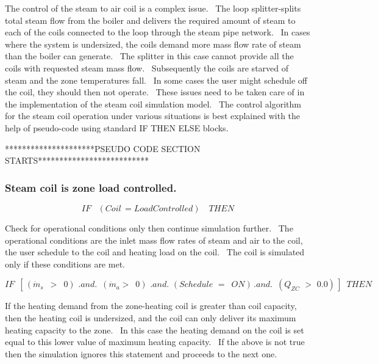 The control of the steam to air coil is a complex issue.~ The loop splitter-splits total steam flow from the boiler and delivers the required amount of steam to each of the coils connected to the loop through the steam pipe network.~ In cases where the system is undersized, the coils demand more mass flow rate of steam than the boiler can generate.~ The splitter in this case cannot provide all the coils with requested steam mass flow.~ Subsequently the coils are starved of steam and the zone temperatures fall.~ In some cases the user might schedule off the coil, they should then not operate.~ These issues need to be taken care of in the implementation of the steam coil simulation model.~ The control algorithm for the steam coil operation under various situations is best explained with the help of pseudo-code using standard IF THEN ELSE blocks.

*********************PSEUDO CODE SECTION STARTS**************************

\subsubsection{Steam coil is zone load controlled.}\label{steam-coil-is-zone-load-controlled.}

\begin{equation}
IF\,\,\,\,\,(Coil\, = LoadControlled)\,\,\,\,\,\,THEN\,
\end{equation}

Check for operational conditions only then continue simulation further.~ The operational conditions are the inlet mass flow rates of steam and air to the coil, the user schedule to the coil and heating load on the coil.~ The coil is simulated only if these conditions are met.

\begin{equation}
IF\,\,\,\left[ {\,({{\dot m}_s}\,\,\, > \,\,\,0)\,\,.and.\,\,\,({{\dot m}_a} > \,\,\,0)\,\,.and.\,\,(Schedule\,\, = \,\,\,ON)\,.and.\,\,\,({Q_{ZC}}\,\, > \,\,0.0)\,} \right]\,\,\,THEN
\end{equation}

If the heating demand from the zone-heating coil is greater than coil capacity, then the heating coil is undersized, and the coil can only deliver its maximum heating capacity to the zone.~ In this case the heating demand on the coil is set equal to this lower value of maximum heating capacity.~ If the above is not true then the simulation ignores this statement and proceeds to the next one.

